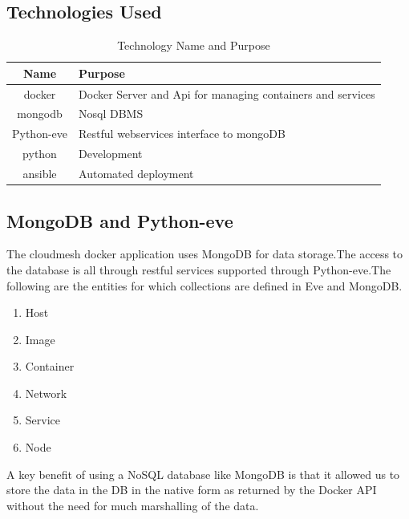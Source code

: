\documentclass[9pt,twocolumn,twoside]{../../styles/osajnl}
\begin{document}
\subsection{Technologies Used}
\begin{table}[H]
\centering
\begin{tabular}{|cp{3cm}|} 
 \hline
 Name & Purpose \\ 
 \hline
 docker \cite{www-Docker} & Docker Server and Api for managing containers and services \\ 
 mongodb \cite{www-MongoDB} & Nosql DBMS \\ 
 Python-eve    \cite{www-Pythoneve} & Restful webservices interface to mongoDB \\ 
 python \cite{www-Python} & Development  \\ 
 ansible \cite{www-Ansible} & Automated deployment \\ [1ex] 
\hline
\end{tabular}
\caption{Technology Name and Purpose}
\label{table:1}
\end{table}

\subsection{MongoDB and Python-eve}

The cloudmesh docker application uses MongoDB\cite{www-MongoDB} for data storage.The access to the database is all through
restful services supported through Python-eve\cite{www-Pythoneve}.The following are the entities for which collections are defined in Eve and MongoDB.

\begin{enumerate}
\item Host
\item Image
\item Container
\item Network
\item Service
\item Node
\end{enumerate}
A key benefit of using a NoSQL database like MongoDB is that it allowed us to store the data in the DB in the native form as returned by the Docker API without the need for much marshalling of the data.
\end{document}
